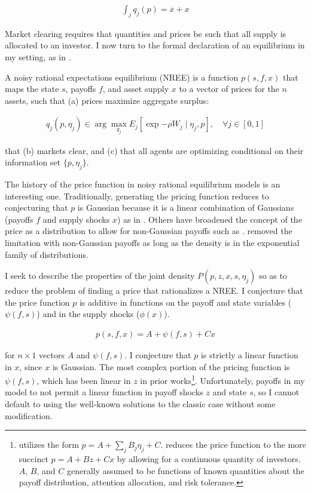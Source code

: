 \documentclass{article}
\begin{document}
\begin{align}
    \int_j{q_j(p)} = \overline x + x
\end{align}

\noindent Market clearing requires that quantities and prices be such that all supply is allocated to an investor. I now turn to the formal declaration of an equilibrium in my setting, as in \textcite{breon-drish_existence_2015}.

\begin{definition}
    A noisy rational expectations equilibrium (NREE) is a function $p(s, f, x)$ that maps the state $s$, payoffs $f$, and asset supply $x$ to a vector of prices for the $n$ assets, such that (a) prices maximize aggregate surplus:

    \begin{align}
        q_j(p, \eta_j) \in \arg\max_{q_j} E_j [\exp{-\rho W_j} \mid \eta_j, p], \quad \forall j \in [0,1]
    \end{align}

    \noindent that (b) markets clear, and (c) that all agents are optimizing conditional on their information set $\{p, \eta_j\}$.

\end{definition}

The history of the price function in noisy rational equilibrium models is an interesting one. Traditionally, generating the pricing function reduces to conjecturing that $p$ is Gaussian because it is a linear combination of Gaussians (payoffs $f$ and supply shocks $x$) as in \textcite{admati_noisy_1985}. Others have broadened the concept of the price as a distribution to allow for non-Gaussian payoffs such as \textcite{breon-drish_existence_2015}. \textcite{breon-drish_existence_2015} removed the limitation with non-Gaussian payoffs as long as the density is in the exponential family of distributions. 

I seek to describe the properties of the joint density $P(p, z, x, s, \eta_j)$ so as to reduce the problem of finding a price that rationalizes a NREE. I conjecture that the price function $p$ is additive in functions on the payoff and state variables ($\psi(f, s)$) and in the supply shocks ($\phi(x)$).

\begin{align}
    p(s,f,x) = A + \psi(f, s) + C x
\end{align}

\noindent for $n \times 1$ vectors $A$ and $\psi(f,s)$. I conjecture that $p$ is strictly a linear function in $x$, since $x$ is Gaussian. The most complex portion of the pricing function is $\psi(f, s)$, which has been linear in $z$ in prior works\footnote{\textcite{admati_noisy_1985} utilizes the form $p = A + \sum_j B_j \eta_j + C$. \textcite{kacperczyk_rational_2016} reduces the price function to the more succinct $p = A + B z + C x$ by allowing for a continuous quantity of investors. $A$, $B$, and $C$ generally assumed to be functions of known quantities about the payoff distribution, attention allocation, and risk tolerance.}. Unfortunately, payoffs in my model to not permit a linear function in payoff shocks $z$ and state $s$, so I cannot default to using the well-known solutions to the classic case without some modification.
\end{document}
